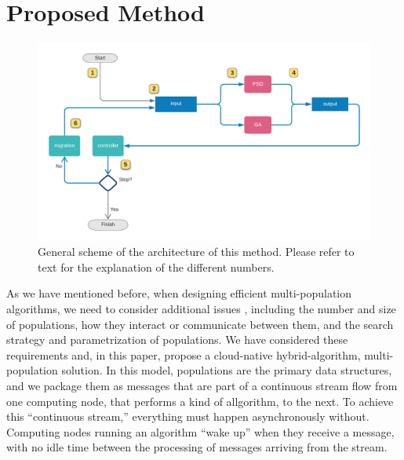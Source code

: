 \documentclass[runningheads]{llncs}
\begin{document}
\section{Proposed Method}
\label{method}
%
\begin{figure}[h!tb]
\includegraphics[width=5in]{../images/kafkeo}
\caption{General scheme of the architecture of this method. Please
  refer to text for the explanation of the different numbers.}
\label{fig:kafkeo}
\end{figure}
%





As we have mentioned before, when designing efficient multi-population
algorithms, we need to consider additional issues \cite{Ma2019},
including the number and size of populations, how they interact or
communicate between them, and the search strategy and parametrization
of populations. We have considered these requirements and, in this
paper, propose a cloud-native hybrid-algorithm, multi-population
solution. In this model, populations are the primary data structures,
and we package them as messages that are part of a continuous stream
flow from one computing node, that performs a kind of allgorithm, to
the next. To achieve this ``continuous stream,'' everything must
happen asynchronously without. Computing nodes running an algorithm
``wake up'' when they receive a message, with no idle time between the
processing of messages arriving from the stream.
\end{document}
